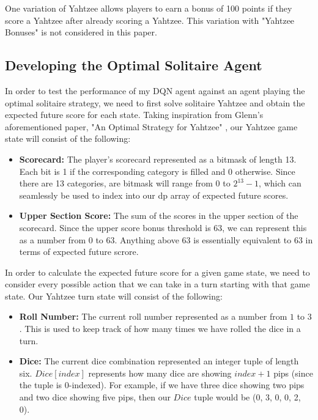 \documentclass[12pt]{article}
\begin{document}
\noindent
One variation of Yahtzee allows players to earn a bonus of 100 points if they score a Yahtzee after already scoring a Yahtzee. This variation with "Yahtzee Bonuses" is not considered in this paper. 

\subsection{Developing the Optimal Solitaire Agent}
In order to test the performance of my DQN agent against an agent playing the optimal solitaire strategy, we need to first solve solitaire Yahtzee and obtain the expected future score for each state. Taking inspiration from Glenn's aforementioned paper, "An Optimal Strategy for Yahtzee" \cite{glenn}, our Yahtzee game state will consist of the following:

\begin{itemize}
    \item \textbf{Scorecard:} The player's scorecard represented as a bitmask of length 13. Each bit is 1 if the corresponding category is filled and 0 otherwise. Since there are 13 categories, are bitmask will range from $0$ to $2^{13} - 1$, which can seamlessly be used to index into our dp array of expected future scores.
    \item \textbf{Upper Section Score:} The sum of the scores in the upper section of the scorecard. Since the upper score bonus threshold is 63, we can represent this as a number from $0$ to $63$. Anything above 63 is essentially equivalent to 63 in terms of expected future scrore.
\end{itemize}

\noindent
In order to calculate the expected future score for a given game state, we need to consider every possible action that we can take in a turn starting with that game state. Our Yahtzee turn state will consist of the following:

\begin{itemize}
    \item \textbf{Roll Number:} The current roll number represented as a number from $1$ to $3$. This is used to keep track of how many times we have rolled the dice in a turn.
    \item \textbf{Dice:} The current dice combination represented an integer tuple of length six. $Dice[index]$ represents how many dice are showing $index + 1$ pips (since the tuple is 0-indexed). For example, if we have three dice showing two pips and two dice showing five pips, then our $Dice$ tuple would be (0, 3, 0, 0, 2, 0).
\end{itemize}
\end{document}
